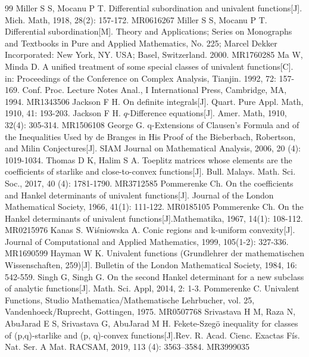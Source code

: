 \documentclass[11pt,twoside, reqno]{article}
\theoremstyle{definition}
\begin{document}
\begin{thebibliography}{99}
	\footnotesize
		Miller S S, Mocanu P T. Differential subordination and univalent functions[J]. Mich. Math, 1918, 28(2): 157-172. MR0616267
		Miller S S, Mocanu P T. Differential subordination[M]. Theory and Applications; Series on Monographs and Textbooks in Pure and  Applied Mathematics, No. 225; Marcel Dekker Incorporated: New York, NY. USA; Basel, Switzerland. 2000. MR1760285
		Ma W, Minda D. A unified treatment of some special classes of univalent functions[C]. in: Proceedings of the Conference on Complex Analysis, Tianjin. 1992, 72: 157-169. Conf. Proc. Lecture Notes Anal., I International Press, Cambridge, MA, 1994. MR1343506
		Jackson F H. On definite integrals[J]. Quart. Pure Appl. Math, 1910, 41: 193-203.
		Jackson F H. $q$-Difference equations[J]. Amer. Math, 1910, 32(4): 305-314. MR1506108
         George G. q-Extensions of Clausen's Formula and of the Inequalities Used by de Branges in His Proof of the Bieberbach, Robertson, and Milin Conjectures[J]. SIAM Journal on Mathematical Analysis, 2006, 20 (4): 1019-1034.
		Thomas D K, Halim S A. Toeplitz matrices whose elements are the coefficients of starlike and close-to-convex functions[J]. Bull. Malays. Math. Sci. Soc., 2017,  40 (4): 1781-1790. MR3712585
		Pommerenke Ch. On the coefficients and Hankel determinants of univalent functions[J]. Journal of the London Mathematical Society, 1966, 41(1): 111-122. MR0185105
		Pommerenke Ch. On the Hankel determinants of univalent functions[J].Mathematika, 1967, 14(1): 108-112. MR0215976
		Kanas S. Wi\'{s}niowska A. Conic regions and k-uniform convexity[J]. Journal of Computational and Applied Mathematics, 1999, 105(1-2): 327-336. MR1690599
		Hayman W K. Univalent functions (Grundlehrer der mathematischen Wissenschaften, 259)[J]. Bulletin of the London Mathematical Society, 1984, 16: 542-559.
		Singh G, Singh G. On the second Hankel determinant for a new subclass of analytic functions[J]. Math. Sci. Appl, 2014, 2: 1-3.
		Pommerenke C. Univalent Functions, Studio Mathematica/Mathematische Lehrbucher, vol. 25, Vandenhoeck/Ruprecht, Gottingen, 1975. MR0507768
         Srivastava H M, Raza N, AbuJarad E S, Srivastava G, AbuJarad M H. Fekete-Szeg\"{o} inequality for classes of (p,q)-starlike and (p, q)-convex functions[J].Rev. R. Acad. Cienc. Exactas F\'{i}s. Nat. Ser. A Mat. RACSAM, 2019, 113 (4): 3563–3584. MR3999035

\end{thebibliography}
\end{document}
